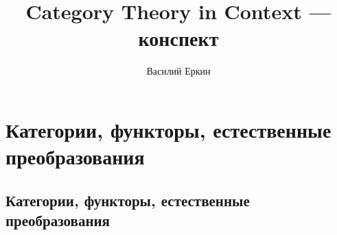 \documentclass[12pt, a4paper, oneside]{book}
\title{Category Theory in Context — конспект}
\author{Василий Еркин}
\date{}
\begin{document}
\frontmatter
\maketitle
\tableofcontents



\mainmatter
\part{Категории, функторы, естественные преобразования}

\setcounter{chapter}{0}
\chapter{Категории, функторы, естественные преобразования}
\setcounter{section}{0}

\end{document}
